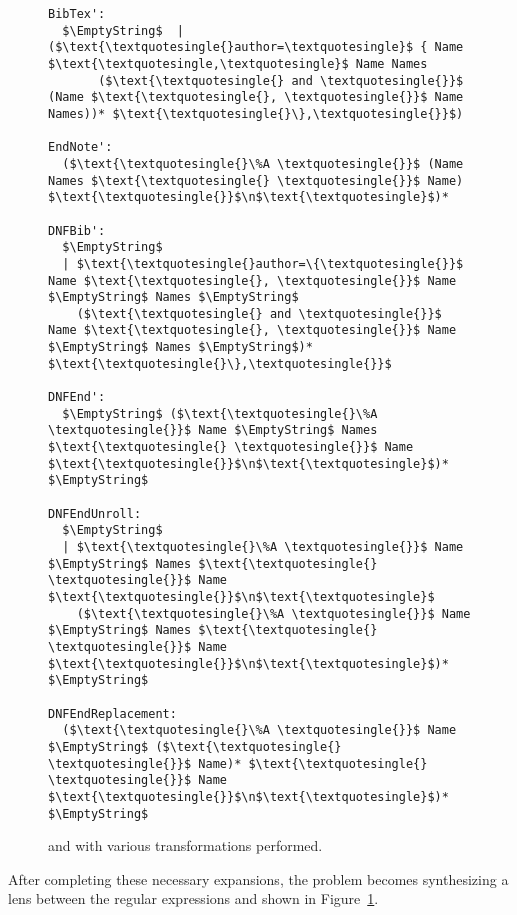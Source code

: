 \documentclass[numbers,10pt,preprint\ifanon ,nocopyrightspace\fi]{sigplanconf}
\begin{document}
\begin{figure}
\begin{lstlisting}[mathescape=true,columns=fixed]
BibTex':
  $\EmptyString$  | ($\text{\textquotesingle{}author=\textquotesingle}$ { Name $\text{\textquotesingle,\textquotesingle}$ Name Names
       ($\text{\textquotesingle{} and \textquotesingle{}}$ (Name $\text{\textquotesingle{}, \textquotesingle{}}$ Name Names))* $\text{\textquotesingle{}\},\textquotesingle{}}$)

EndNote':
  ($\text{\textquotesingle{}\%A \textquotesingle{}}$ (Name Names $\text{\textquotesingle{} \textquotesingle{}}$ Name) $\text{\textquotesingle{}}$\n$\text{\textquotesingle}$)*

DNFBib':
  $\EmptyString$
  | $\text{\textquotesingle{}author=\{\textquotesingle{}}$ Name $\text{\textquotesingle{}, \textquotesingle{}}$ Name $\EmptyString$ Names $\EmptyString$
    ($\text{\textquotesingle{} and \textquotesingle{}}$ Name $\text{\textquotesingle{}, \textquotesingle{}}$ Name $\EmptyString$ Names $\EmptyString$)* $\text{\textquotesingle{}\},\textquotesingle{}}$

DNFEnd':
  $\EmptyString$ ($\text{\textquotesingle{}\%A \textquotesingle{}}$ Name $\EmptyString$ Names $\text{\textquotesingle{} \textquotesingle{}}$ Name $\text{\textquotesingle{}}$\n$\text{\textquotesingle}$)* $\EmptyString$

DNFEndUnroll:
  $\EmptyString$
  | $\text{\textquotesingle{}\%A \textquotesingle{}}$ Name $\EmptyString$ Names $\text{\textquotesingle{} \textquotesingle{}}$ Name $\text{\textquotesingle{}}$\n$\text{\textquotesingle}$
    ($\text{\textquotesingle{}\%A \textquotesingle{}}$ Name $\EmptyString$ Names $\text{\textquotesingle{} \textquotesingle{}}$ Name $\text{\textquotesingle{}}$\n$\text{\textquotesingle}$)* $\EmptyString$

DNFEndReplacement:
  ($\text{\textquotesingle{}\%A \textquotesingle{}}$ Name $\EmptyString$ ($\text{\textquotesingle{} \textquotesingle{}}$ Name)* $\text{\textquotesingle{} \textquotesingle{}}$ Name $\text{\textquotesingle{}}$\n$\text{\textquotesingle}$)* $\EmptyString$
\end{lstlisting}
  \label{fig:examples-expanded}
  \caption{
     and  with various transformations performed.
  }
\end{figure}
After completing these necessary expansions, the problem becomes synthesizing a
lens between the regular expressions  and  shown in
Figure~\ref{fig:examples-expanded}.
\end{document}

